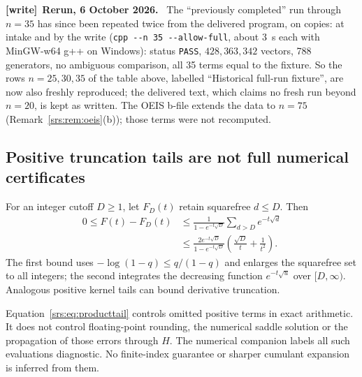 \documentclass[11pt]{article}
\numberwithin{equation}{section}
\theoremstyle{remark}\newtheorem{remark}[theorem]{Remark}
\newcommand{\file}[1]{\nolinkurl{#1}}
\newenvironment{writenote}[1][]{\par\smallskip\begingroup\small
 \noindent\textbf{[write]}\if\relax\detokenize{#1}\relax\else~\textbf{#1.}\fi\ }%
 {\par\endgroup\smallskip}
\begin{document}
\begin{writenote}[Rerun, 6 October 2026]
The ``previously completed'' run through $n=35$ has since been repeated
twice from the delivered program, on copies: at intake and by the write
(\file{cpp --n 35 --allow-full}, about 3~s each with MinGW-w64 g++ on
Windows): status \file{PASS}, $428{,}363{,}342$ vectors, 788 generators, no
ambiguous comparison, all 35 terms equal to the fixture. So the rows
$n=25,30,35$ of the table above, labelled ``Historical full-run fixture'',
are now also freshly reproduced; the delivered text, which claims no fresh
run beyond $n=20$, is kept as written. The OEIS b-file extends the data to
$n=75$ (Remark~\ref{srs:rem:oeis}(b)); those terms were not recomputed.
\end{writenote}

\subsection{Positive truncation tails are not full numerical certificates}
For an integer cutoff $D\ge1$, let $F_D(t)$ retain squarefree $d\le D$. Then
\begin{align}
 0\le F(t)-F_D(t)
 &\le\frac{1}{1-e^{-t\sqrt D}}\sum_{d>D}e^{-t\sqrt d}\nonumber\\
 &\le\frac{2e^{-t\sqrt D}}{1-e^{-t\sqrt D}}
       \left(\frac{\sqrt D}{t}+\frac1{t^2}\right).
 \label{srs:eq:producttail}
\end{align}
The first bound uses $-\log(1-q)\le q/(1-q)$ and enlarges the squarefree set to all integers; the second integrates the decreasing function $e^{-t\sqrt u}$ over $[D,\infty)$. Analogous positive kernel tails can bound derivative truncation.

Equation~\eqref{srs:eq:producttail} controls omitted positive terms in exact arithmetic. It does not control floating-point rounding, the numerical saddle solution or the propagation of those errors through $H$. The numerical companion labels all such evaluations diagnostic. No finite-index guarantee or sharper cumulant expansion is inferred from them.
\end{document}
